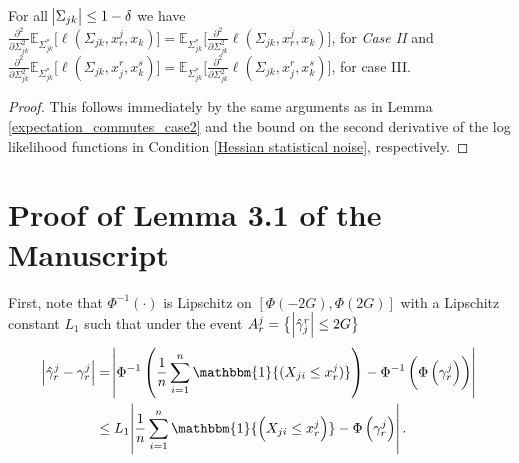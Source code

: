 \begin{corollary}\label{expectation_commutes_case3}
    For all $\abs{\Sigma_{jk}} \leq 1-\delta$ we have \\
        $\frac{\partial^2 }{\partial \Sigma_{jk}^2} \mathbb{E}_{\Sigma_{jk}^*} \big[\ell(\Sigma_{jk}, x_r^j,x_k)\big] = \mathbb{E}_{\Sigma_{jk}^*} \Bigg[\frac{\partial^2 }{\partial \Sigma_{jk}^2} \ell(\Sigma_{jk}, x_r^j,x_k) \Bigg]$, for \textit{Case II} and \\
        $\frac{\partial^2 }{\partial \Sigma_{jk}^2} \mathbb{E}_{\Sigma_{jk}^*} \big[\ell(\Sigma_{jk}, x_j^r,x_k^s)\big] = \mathbb{E}_{\Sigma_{jk}^*} \Bigg[\frac{\partial^2 }{\partial \Sigma_{jk}^2} \ell(\Sigma_{jk}, x_j^r,x_k^s) \Bigg]$, for case III.
    
    \begin{proof}
        This follows immediately by the same arguments as in Lemma \ref{expectation_commutes_case2} and the bound on the second derivative of the log likelihood functions in Condition \ref{Hessian statistical noise}, respectively. 
    \end{proof}
\end{corollary}

\section{Proof of Lemma 3.1 of the Manuscript %
}\label{lemma_threshold_proof}

First, note that $\Phi^{-1}(\cdot)$ is Lipschitz on $[\Phi(-2G),\Phi(2G)]$ with a Lipschitz constant $L_1$ such that under the event $A_r^j = \big\{\abs{\hat{\gamma}_j^r} \leq 2G\big\}$
\begin{equation*}
    \begin{split}
        \abs{\hat{\gamma}_r^j - \gamma_r^j} &= \abs{\Phi^{-1}\left(\frac{1}{n} \sum_{i=1}^n \mathbbm{1}{(X_{ji} \leq x_r^j)}\right) - \Phi^{-1}\left(\Phi\left(\gamma_r^j\right)\right)} \\
        &\leq L_1\abs{\frac{1}{n} \sum_{i=1}^n \mathbbm{1}{\left(X_{ji} \leq x_r^j\right)} - \Phi\left(\gamma_r^j\right)}.
    \end{split}
\end{equation*}


